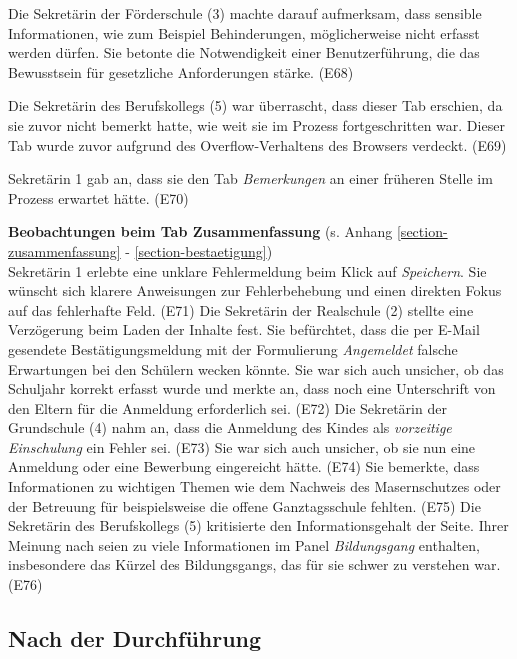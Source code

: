 Die Sekretärin der Förderschule (3) machte darauf aufmerksam, dass sensible Informationen, wie zum Beispiel Behinderungen, möglicherweise nicht erfasst werden dürfen. Sie betonte die Notwendigkeit einer Benutzerführung, die das Bewusstsein für gesetzliche Anforderungen stärke. (E68)

Die Sekretärin des Berufskollegs (5) war überrascht, dass dieser Tab erschien, da sie zuvor nicht bemerkt hatte, wie weit sie im Prozess fortgeschritten war. Dieser Tab wurde zuvor aufgrund des Overflow-Verhaltens des Browsers verdeckt. (E69)

Sekretärin 1 gab an, dass sie den Tab \textit{Bemerkungen} an einer früheren Stelle im Prozess erwartet hätte. (E70)

\textbf{Beobachtungen beim Tab \glqq Zusammenfassung\grqq{}} (s. Anhang \ref{section-zusammenfassung} - \ref{section-bestaetigung})\\
Sekretärin 1 erlebte eine unklare Fehlermeldung beim Klick auf \textit{Speichern}. Sie wünscht sich klarere Anweisungen zur Fehlerbehebung und einen direkten Fokus auf das fehlerhafte Feld. (E71)
Die Sekretärin der Realschule (2) stellte eine Verzögerung beim Laden der Inhalte fest. Sie befürchtet, dass die per E-Mail gesendete Bestätigungsmeldung mit der Formulierung \textit{Angemeldet} falsche Erwartungen bei den Schülern wecken könnte. Sie war sich auch unsicher, ob das Schuljahr korrekt erfasst wurde und merkte an, dass noch eine Unterschrift von den Eltern für die Anmeldung erforderlich sei. (E72)
Die Sekretärin der Grundschule (4) nahm an, dass die Anmeldung des Kindes als \textit{vorzeitige Einschulung} ein Fehler sei. (E73) Sie war sich auch unsicher, ob sie nun eine \glqq Anmeldung\grqq{} oder eine \glqq Bewerbung\grqq{} eingereicht hätte. (E74) Sie bemerkte, dass Informationen zu wichtigen Themen wie dem Nachweis des Masernschutzes oder der Betreuung für beispielsweise die offene Ganztagsschule fehlten. (E75)
Die Sekretärin des Berufskollegs (5) kritisierte den Informationsgehalt der Seite. Ihrer Meinung nach seien zu viele Informationen im Panel \textit{Bildungsgang} enthalten, insbesondere das Kürzel des Bildungsgangs, das für sie schwer zu verstehen war. (E76)

\subsection{Nach der Durchführung}

